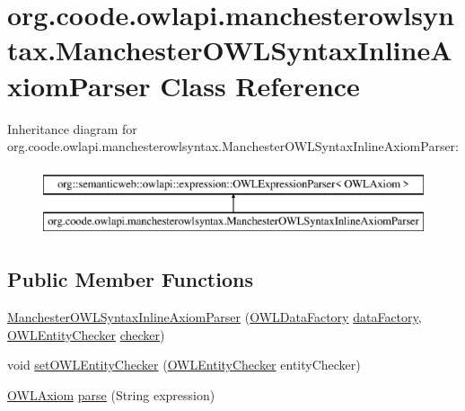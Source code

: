 \hypertarget{classorg_1_1coode_1_1owlapi_1_1manchesterowlsyntax_1_1_manchester_o_w_l_syntax_inline_axiom_parser}{\section{org.\-coode.\-owlapi.\-manchesterowlsyntax.\-Manchester\-O\-W\-L\-Syntax\-Inline\-Axiom\-Parser Class Reference}
\label{classorg_1_1coode_1_1owlapi_1_1manchesterowlsyntax_1_1_manchester_o_w_l_syntax_inline_axiom_parser}
}
Inheritance diagram for org.\-coode.\-owlapi.\-manchesterowlsyntax.\-Manchester\-O\-W\-L\-Syntax\-Inline\-Axiom\-Parser\-:\begin{figure}[H]
\begin{center}
\leavevmode
\includegraphics[height=2.000000cm]{classorg_1_1coode_1_1owlapi_1_1manchesterowlsyntax_1_1_manchester_o_w_l_syntax_inline_axiom_parser}
\end{center}
\end{figure}
\subsection*{Public Member Functions}
\begin{DoxyCompactItemize}
\item 
\hyperlink{classorg_1_1coode_1_1owlapi_1_1manchesterowlsyntax_1_1_manchester_o_w_l_syntax_inline_axiom_parser_a78031e7e8bbf16ecbc33141af4e06d7d}{Manchester\-O\-W\-L\-Syntax\-Inline\-Axiom\-Parser} (\hyperlink{interfaceorg_1_1semanticweb_1_1owlapi_1_1model_1_1_o_w_l_data_factory}{O\-W\-L\-Data\-Factory} \hyperlink{classorg_1_1coode_1_1owlapi_1_1manchesterowlsyntax_1_1_manchester_o_w_l_syntax_inline_axiom_parser_add48cc53177673001a4f3becee83d679}{data\-Factory}, \hyperlink{interfaceorg_1_1semanticweb_1_1owlapi_1_1expression_1_1_o_w_l_entity_checker}{O\-W\-L\-Entity\-Checker} \hyperlink{classorg_1_1coode_1_1owlapi_1_1manchesterowlsyntax_1_1_manchester_o_w_l_syntax_inline_axiom_parser_ae5d59c1147b4c9f1dc1dfca067f4992e}{checker})
\item 
void \hyperlink{classorg_1_1coode_1_1owlapi_1_1manchesterowlsyntax_1_1_manchester_o_w_l_syntax_inline_axiom_parser_accc924e518bfee93131fb03d4e02c188}{set\-O\-W\-L\-Entity\-Checker} (\hyperlink{interfaceorg_1_1semanticweb_1_1owlapi_1_1expression_1_1_o_w_l_entity_checker}{O\-W\-L\-Entity\-Checker} entity\-Checker)
\item 
\hyperlink{interfaceorg_1_1semanticweb_1_1owlapi_1_1model_1_1_o_w_l_axiom}{O\-W\-L\-Axiom} \hyperlink{classorg_1_1coode_1_1owlapi_1_1manchesterowlsyntax_1_1_manchester_o_w_l_syntax_inline_axiom_parser_a7de1b68e65092303bbad69e0edecf2f5}{parse} (String expression)
\end{DoxyCompactItemize}
